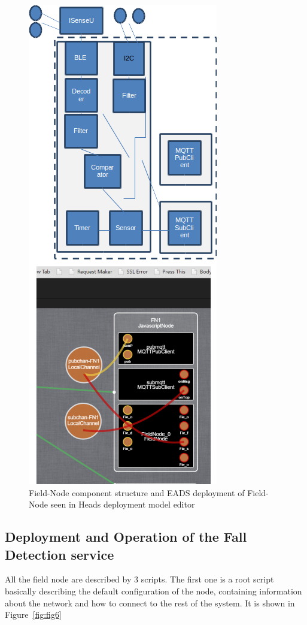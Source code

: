 \begin{figure}[h]
	\centering
	\includegraphics[width=0.6\linewidth]{figures/fig5}
	\caption{Field-Node component structure and EADS deployment of Field-Node seen in Heads deployment model editor}
	\label{fig:fig5}
\end{figure}


\subsection{Deployment and Operation of the Fall Detection service}
All the field node are described by 3 scripts. The first one is a root script basically describing the default configuration of the node, containing information about the network and how to connect to the rest of the system. It is shown in Figure~\ref{fig:fig6}


